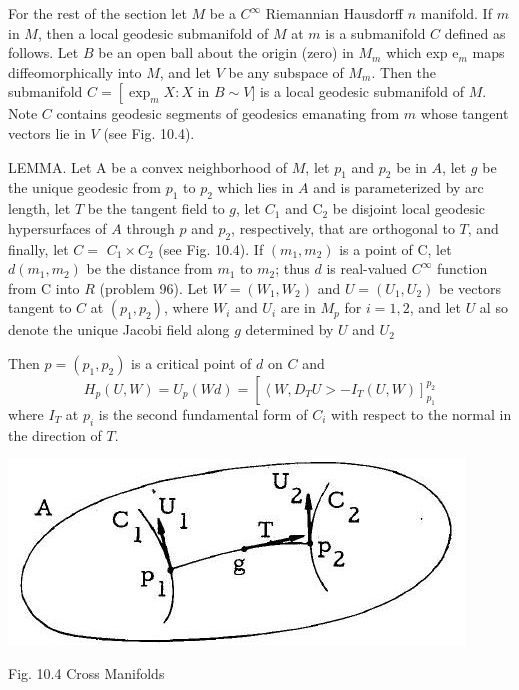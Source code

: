 \documentclass[10pt]{article}
\begin{document}
For the rest of the section let $M$ be a $C^{\infty}$ Riemannian Hausdorff $n$ manifold. If $m$ in $M$, then a local geodesic submanifold of $M$ at $m$ is a submanifold $C$ defined as follows. Let $B$ be an open ball about the origin (zero) in $M_{m}$ which exp $\mathrm{e}_{m}$ maps diffeomorphically into $M$, and let $V$ be any subspace of $M_{m}$. Then the submanifold $C=\left[\exp _{m} X: X\right.$ in $B \sim V]$ is a local geodesic submanifold of $M$. Note $C$ contains geodesic segments of geodesics emanating from $m$ whose tangent vectors lie in $V$ (see Fig. 10.4).

LEMMA. Let A be a convex neighborhood of $M$, let $p_{1}$ and $p_{2}$ be in $A$, let $g$ be the unique geodesic from $p_{1}$ to $p_{2}$ which lies in $A$ and is parameterized by arc length, let $T$ be the tangent field to $g$, let $C_{1}$ and $\mathrm{C}_{2}$ be disjoint local geodesic hypersurfaces of $A$ through $p$ and $p_{2}$, respectively, that are orthogonal to $T$, and finally, let $C=$ $C_{1} \times C_{2}$ (see Fig. 10.4). If $\left(m_{1}, m_{2}\right)$ is a point of C, let $d\left(m_{1}, m_{2}\right)$ be the distance from $m_{1}$ to $m_{2}$; thus $d$ is real-valued $C^{\infty}$ function from C into $R$ (problem 96). Let $W=\left(W_{1}, W_{2}\right)$ and $U=\left(U_{1}, U_{2}\right)$ be vectors tangent to $C$ at $\left(p_{1}, p_{2}\right)$, where $W_{i}$ and $U_{i}$ are in $M_{p}$ for $i=1,2$, and let $U$ al so denote the unique Jacobi field along $g$ determined by $U$ and $U_{2}$

Then $p=\left(p_{1}, p_{2}\right)$ is a critical point of $d$ on $C$ and
$$
H_{p}(U, W)=U_{p}(W d)=\left[\left\langle W, D_{T} U>-I_{T}(U, W)\right]_{p_{1}}^{p_{2}}\right.
$$
where $I_{T}$ at $p_{i}$ is the second fundamental form of $C_{i}$ with respect to the normal in the direction of $T$.

\includegraphics[max width=\textwidth]{2022_07_16_f4e476ee2159dc67e746g-83}

Fig. 10.4 Cross Manifolds
\end{document}
